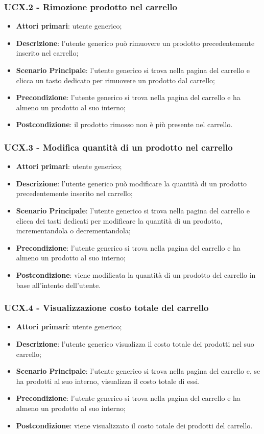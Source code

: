 \subsubsection{UCX.2 - Rimozione prodotto nel carrello}
\begin{itemize}
\item \textbf{Attori primari}: utente generico;
\item \textbf{Descrizione}: l'utente generico può rimuovere un prodotto precedentemente inserito nel carrello;
\item \textbf{Scenario Principale}: l'utente generico si trova nella pagina del carrello e clicca un tasto dedicato per rimuovere un prodotto dal carrello;
\item \textbf{Precondizione}: l'utente generico si trova nella pagina del carrello e ha almeno un prodotto al suo interno;
\item \textbf{Postcondizione}: il prodotto rimosso non è più presente nel carrello.
\end{itemize}

\subsubsection{UCX.3 - Modifica quantità di un prodotto nel carrello}
\begin{itemize}
\item \textbf{Attori primari}: utente generico;
\item \textbf{Descrizione}: l'utente generico può modificare la quantità di un prodotto precedentemente inserito nel carrello;
\item \textbf{Scenario Principale}: l'utente generico si trova nella pagina del carrello e clicca dei tasti dedicati per modificare la quantità di un prodotto, incrementandola o decrementandola;
\item \textbf{Precondizione}: l'utente generico si trova nella pagina del carrello e ha almeno un prodotto al suo interno;
\item \textbf{Postcondizione}: viene modificata la quantità di un prodotto del carrello in base all'intento dell'utente.
\end{itemize}

\subsubsection{UCX.4 - Visualizzazione costo totale del carrello}
\begin{itemize}
\item \textbf{Attori primari}: utente generico;
\item \textbf{Descrizione}: l'utente generico visualizza il costo totale dei prodotti nel suo carrello;
\item \textbf{Scenario Principale}: l'utente generico si trova nella pagina del carrello e, se ha prodotti al suo interno, visualizza il costo totale di essi.
\item \textbf{Precondizione}: l'utente generico si trova nella pagina del carrello e ha almeno un prodotto al suo interno;
\item \textbf{Postcondizione}: viene visualizzato il costo totale dei prodotti del carrello.
\end{itemize}


